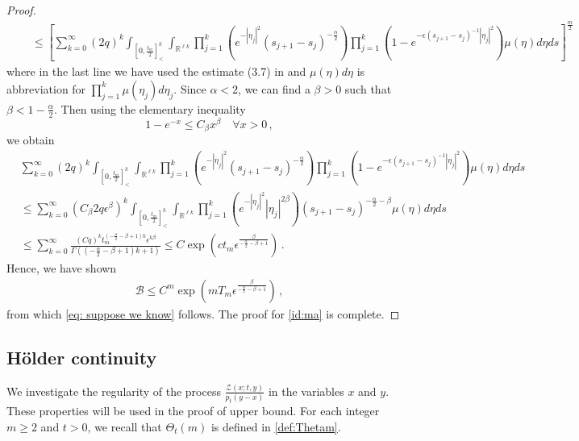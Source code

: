 \documentclass[12pt,reqno]{amsart}
\theoremstyle{remark}
\newcommand{\1}{\mathbf{1}}
\def\RR{\mathbb{R}}
\def\EE{\mathbb{E}}
\def\Z{\mathcal{Z}}
\def\B{\mathcal{B}}
\begin{document}
\begin{proof}
\begin{align*}
	& \quad \leq \left[\sum_{k=0}^{\infty} (2q)^k \int_{[0, \frac{t_m}{2}]^k_{<}} \int_{\RR^{\ell k}} \prod_{j=1}^k \left(e^{-|\eta_j|^2 } (s_{j+1}-s_j)^{-\frac{\alpha}{2}}\right) \prod_{j=1}^k \left(1-e^{-\epsilon (s_{j+1} - s_j)^{-1} |\eta_j|^2} \right) \mu(\eta)d\eta ds \right]^{\frac{m}{2}}
	 \end{align*}
	where in the last line we have used the estimate (3.7) in \cite{MR3354615} and $\mu(\eta)d \eta$  is abbreviation for $\prod_{j=1}^k \mu(\eta_j)d\eta_j$. Since $\alpha < 2$, we can find a $\beta>0$ such that $\beta < 1-\frac{\alpha}{2}$. Then using the elementary inequality
	\begin{equation*}
	1-e^{-x} \leq  C_{\beta}x^{\beta}\quad\forall x>0\,,
	\end{equation*}
	we obtain 
	\begin{align*}
	&\sum_{k=0}^{\infty} (2q)^k \int_{[0, \frac{t_m}{2}]^k_{<}} \int_{\RR^{\ell k}} \prod_{j=1}^k \left(e^{-|\eta_j|^2 }  (s_{j+1}-s_j)^{-\frac{\alpha}{2}}\right) \prod_{j=1}^k \left(1-e^{-\epsilon (s_{j+1} - s_j)^{-1} |\eta_j|^2} \right) \mu(\eta)d\eta ds\\
	&\leq \sum_{k=0}^{\infty} (C_{\beta}2q\epsilon^{\beta})^k \int_{[0, \frac{t_m}{2}]^k_{<}} \int_{\RR^{\ell k}} \prod_{j=1}^k \left( e^{-|\eta_j|^2 } |\eta_j|^{2\beta}\right) (s_{j+1}-s_j)^{-\frac{\alpha}{2}-\beta}  \mu(\eta)d\eta ds\\
	& \leq \sum_{k=0}^{\infty} \frac{(Cq)^k t_m^{(-\frac{\alpha}{2} -\beta +1) k } \epsilon^{k\beta}}{\Gamma((-\frac{\alpha}{2} -\beta +1) k + 1)} \le C \exp \left(c t_m \epsilon^{\frac{\beta}{ -\frac{\alpha}{2} -\beta +1}}  \right)\,.
	\end{align*}
	Hence, we have shown
	\begin{align*}
	\B\leq C^m \exp \left( m T_m \epsilon^{\frac{\beta}{ -\frac{\alpha}{2} -\beta +1}}  \right)\,,
	\end{align*}
	from which \eqref{eq: suppose we know} follows. The proof for \eqref{id:ma} is complete. 
	\end{proof}


\subsection*{H\"older continuity} %
    We investigate the regularity of the process $\frac{\Z(x;t,y)}{p_t(y-x)}$ in the variables $x$ and $y$. These properties will be used in the proof of upper bound. For each integer $m\ge2$ and $t>0$, we recall that $\Theta_t(m)$ is defined in \eqref{def:Thetam}. 
	
\end{document}
